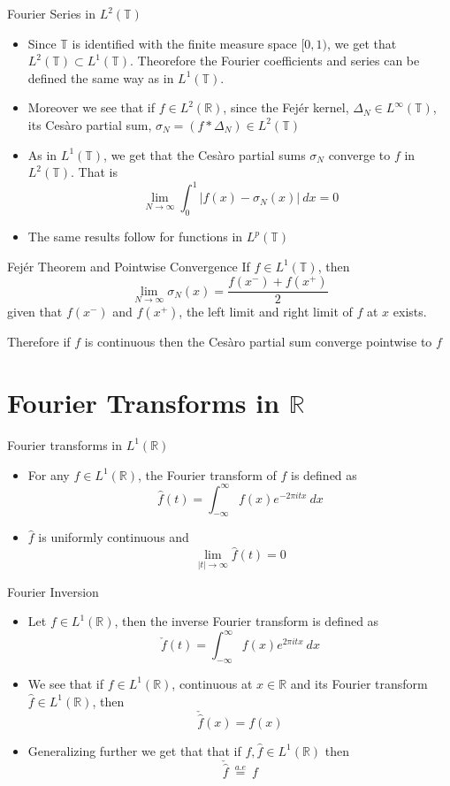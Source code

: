 \documentclass[compress]{beamer}
\newcommand{\R}{\mathbb R}
\newcommand{\T}{\mathbb T}
\begin{document}
\begin{frame}{Fourier Series in $L^2(\T)$}
  \begin{itemize}
    \item Since $\T$ is identified with the finite measure space $[0, 1)$, we get that $L^2(\T) \subset L^1(\T)$. Theorefore the Fourier coefficients and series can be defined the same way as in $L^1(\T)$.
    \item Moreover we see that if $f \in L^2(\R)$, since the Fej\'er kernel, $\Delta_N \in L^\infty(\T)$, its Ces\`aro partial sum, $\sigma_N = (f*\Delta_N) \in L^2(\T)$
    \item As in $L^1(\T)$, we get that the Ces\`aro partial sums $\sigma_N$ converge to $f$ in $L^2(\T)$. That is $$\lim_{N\to \infty} \int_0^1 \left| f(x) - \sigma_N(x)\right| \ dx  = 0 $$
    \item The same results follow for functions in $L^p(\T)$
  \end{itemize}
\end{frame}

\begin{frame}{Fej\'er Theorem and Pointwise Convergence}
  If $f \in L^1(\T)$, then $$\lim_{N \to \infty} \sigma_N(x) = \frac{f(x^-) + f(x^+)}{2}$$
  given that $f(x^-)$ and $f(x^+)$, the left limit and right limit of $f$ at $x$ exists.

  Therefore if $f$ is continuous then the Ces\`aro partial sum converge pointwise to $f$
\end{frame}

\section{Fourier Transforms in $\R$}

\begin{frame}{Fourier transforms in $L^1(\R)$}
  \begin{itemize}
    \item For any $f\in L^1(\R)$, the Fourier transform of $f$ is defined as $$\hat{f}(t) = \int_{-\infty}^{\infty} f(x)e^{-2\pi i t x} \ dx $$
    \item $\hat{f}$ is uniformly continuous and $$\lim_{|t| \to \infty} \hat{f}(t) = 0$$
  \end{itemize}
\end{frame}

\begin{frame}{Fourier Inversion}
  \begin{itemize}
    \item Let $f \in L^1(\R)$, then the inverse Fourier transform is defined as $$\check{f}(t) = \int_{-\infty}^\infty f(x)e^{2\pi itx} \ dx$$
    \item We see that if $f \in L^1(\R)$, continuous at $x \in \R$ and its Fourier transform $\hat{f} \in L^1(\R)$, then $$\check{\hat{f}}(x) = f(x)$$
    \item Generalizing further we get that that if $f, \hat{f} \in L^1(\R)$ then $$\check{\hat{f}} \ \stackrel{a.e}{=} \ f$$
  \end{itemize}
\end{frame}
\end{document}
